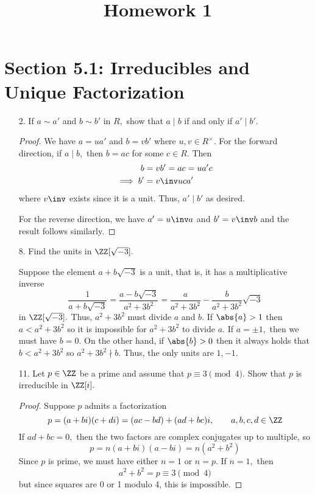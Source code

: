 \documentclass{article}
\begin{document}
\title{Homework 1}
\maketitle
\thispagestyle{fancy}

\section*{Section 5.1: Irreducibles and Unique Factorization}

\begin{itemize}
	\item[2.] If $a\sim a'$ and $b\sim b'$ in $R,$ show that $a\mid b$ if and only if $a'\mid b'.$
		\begin{proof}
			We have $a=ua'$ and $b=vb'$ where $u, v\in R^\times.$ For the forward direction, if $a\mid b,$ then $b=ac$ for some $c\in R.$ Then
			\begin{align*}
				b &= vb'=ac=ua'c \\
				\implies b'&=v\inv uc a'
			\end{align*}
			where $v\inv$ exists since it is a unit. Thus, $a'\mid b'$ as desired.

			For the reverse direction, we have $a'=u\inv a$ and $b'=v\inv b$ and the result follows similarly.
		\end{proof}

	\item[8.] Find the units in $\ZZ[\sqrt{-3}].$
		\begin{soln}
			Suppose the element $a+b\sqrt{-3}$ is a unit, that is, it has a multiplicative inverse
			\[\frac{1}{a+b\sqrt{-3}}=\frac{a-b\sqrt{-3}}{a^2+3b^2}=\frac{a}{a^2+3b^2}-\frac{b}{a^2+3b^2}\sqrt{-3}\] 
			in $\ZZ[\sqrt{-3}].$ Thus, $a^2+3b^2$ must divide $a$ and $b.$ If $\abs{a}>1$ then $a<a^2+3b^2$ so it is impossible for $a^2+3b^2$ to divide $a.$ If $a=\pm1,$ then we must have $b=0.$ On the other hand, if $\abs{b}>0$ then it always holds that $b<a^2+3b^2$ so $a^2+3b^2\nmid b.$ Thus, the only units are $\boxed{1, -1}.$
		\end{soln}

	\item[11.] Let $p\in \ZZ$ be a prime and assume that $p\equiv3\pmod4.$ Show that $p$ is irreducible in $\ZZ[i].$ 
		\begin{proof}
			Suppose $p$ admits a factorization
			\[p=(a+bi)(c+di)=(ac-bd)+(ad+bc)i, \quad\quad a, b, c, d\in\ZZ\]
			If $ad+bc=0,$ then the two factors are complex conjugates up to multiple, so
			\[p=n(a+bi)(a-bi)=n(a^2+b^2)\]
			Since $p$ is prime, we must have either $n=1$ or $n=p.$ If $n=1,$ then 
			\[a^2+b^2=p\equiv3\pmod 4\]
			but since squares are 0 or 1 modulo 4, this is impossible.
			

\end{proof}
\end{itemize}
\end{document}
